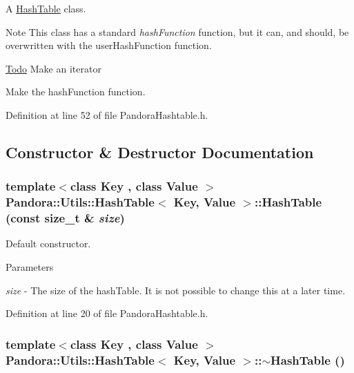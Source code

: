 A \hyperlink{classPandora_1_1Utils_1_1HashTable}{HashTable} class. \begin{DoxyNote}{Note}
This class has a standard {\itshape hashFunction\/} function, but it can, and should, be overwritten with the userHashFunction function. 
\end{DoxyNote}
\begin{Desc}
\item[\hyperlink{todo__todo000001}{Todo}]Make an iterator 

Make the hashFunction function. \end{Desc}


Definition at line 52 of file PandoraHashtable.h.

\subsection{Constructor \& Destructor Documentation}
\hypertarget{classPandora_1_1Utils_1_1HashTable_a3650951a9de3e61dd2deade67636a0cf}{
\subsubsection[{HashTable}]{\setlength{\rightskip}{0pt plus 5cm}template$<$class Key , class Value $>$ {\bf Pandora::Utils::HashTable}$<$ Key, Value $>$::{\bf HashTable} (const size\_\-t \& {\em size})}}
\label{classPandora_1_1Utils_1_1HashTable_a3650951a9de3e61dd2deade67636a0cf}


Default constructor. 
\begin{DoxyParams}{Parameters}
\item[{\em size}]-\/ The size of the hashTable. It is not possible to change this at a later time. \end{DoxyParams}


Definition at line 20 of file PandoraHashtable.h.\hypertarget{classPandora_1_1Utils_1_1HashTable_adfb815eb2cfe21eca1beffa61be7726d}{
\subsubsection[{$\sim$HashTable}]{\setlength{\rightskip}{0pt plus 5cm}template$<$class Key , class Value $>$ {\bf Pandora::Utils::HashTable}$<$ Key, Value $>$::$\sim${\bf HashTable} ()}}
\label{classPandora_1_1Utils_1_1HashTable_adfb815eb2cfe21eca1beffa61be7726d}


